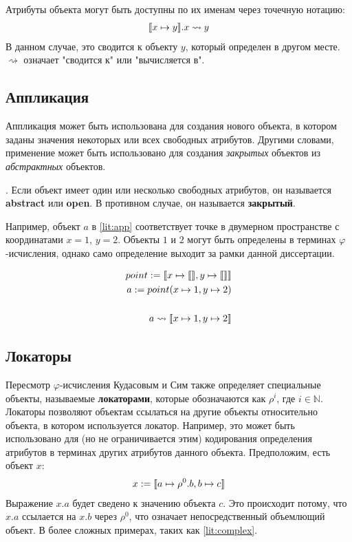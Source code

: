 Атрибуты объекта могут быть доступны по их именам через точечную нотацию:
\begin{align*}
    \llbracket x \mapsto y \rrbracket.x \rightsquigarrow y
\end{align*}
В данном случае, это сводится к объекту $y$, который определен в другом месте. $\rightsquigarrow$ означает "сводится к" или "вычисляется в".

\subsection{Аппликация}
Аппликация может быть использована для создания нового объекта, в котором заданы значения некоторых или всех свободных атрибутов. Другими словами, применение может быть использовано для создания \textit{закрытых} объектов из \textit{абстрактных} объектов.

\begin{definition}.
    Если объект имеет один или несколько свободных атрибутов, он называется \textbf{abstract} или \textbf{open}. В противном случае, он называется \textbf{закрытый}.
\end{definition}

Например, объект $a$ в \ref{lit:app} соответствует точке в двумерном пространстве с координатами $x = 1$, $y = 2$. Объекты $1$ и $2$ могут быть определены в терминах $\varphi$-исчисления, однако само определение выходит за рамки данной диссертации.

\begin{align}
    point := \llbracket x \mapsto \llbracket  \rrbracket, y \mapsto \llbracket  \rrbracket \rrbracket \\
    \label{lit:app}
    a := point(x \mapsto 1, y \mapsto 2) \\\\
    a \rightsquigarrow \llbracket x \mapsto 1, y \mapsto 2 \rrbracket
\end{align}


\subsection{Локаторы}

Пересмотр $\varphi$-исчисления Кудасовым и Сим \cite{kudasov} также определяет специальные объекты, называемые \textbf{локаторами}, которые обозначаются как $\rho^i$, где $i \in \mathbb{N}$. Локаторы позволяют объектам ссылаться на другие объекты относительно объекта, в котором используется локатор. Например, это может быть использовано для (но не ограничивается этим) кодирования определения атрибутов в терминах других атрибутов данного объекта. Предположим, есть объект $x$:
\begin{align*}
    x := \llbracket a \mapsto \rho^0.b, b \mapsto c \rrbracket
\end{align*}
Выражение $x.a$ будет сведено к значению объекта $c$. Это происходит потому, что $x.a$ ссылается на $x.b$ через $\rho^0$, что означает непосредственный объемлющий объект. В более сложных примерах, таких как \ref{lit:complex}.

